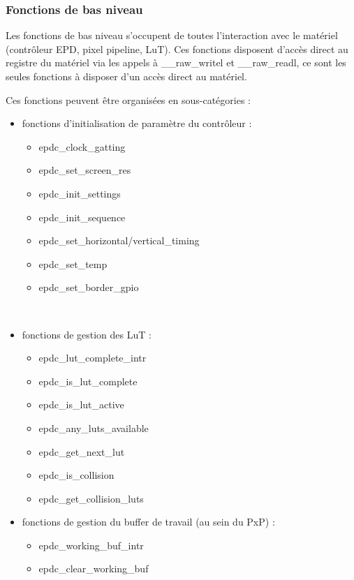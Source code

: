 \subsubsection{Fonctions de bas niveau}

Les fonctions de bas niveau s'occupent de toutes l'interaction avec le matériel (contrôleur EPD, pixel pipeline, LuT).
Ces fonctions disposent d'accès direct au registre du matériel via les appels à \_\_raw\_writel et \_\_raw\_readl, ce sont les seules fonctions à disposer d'un accès direct au matériel.


Ces fonctions peuvent être organisées en sous-catégories : 

\begin{itemize}
\renewcommand{\labelitemi}{$\bullet$}
	\item fonctions d'initialisation de paramètre du contrôleur : 
		\begin{itemize}
		\renewcommand{\labelitemi}{$\to$}
			\item epdc\_clock\_gatting
			\item epdc\_set\_screen\_res
			\item epdc\_init\_settings
			\item epdc\_init\_sequence
			\item epdc\_set\_horizontal/vertical\_timing
			\item epdc\_set\_temp
			\item epdc\_set\_border\_gpio
		\end{itemize}
		~\\
	\item fonctions de gestion des LuT : 
		\begin{itemize}
			\item epdc\_lut\_complete\_intr
			\item epdc\_is\_lut\_complete
			\item epdc\_is\_lut\_active
			\item epdc\_any\_luts\_available
			\item epdc\_get\_next\_lut
			\item epdc\_is\_collision
			\item epdc\_get\_collision\_luts
		\end{itemize}
	\item fonctions de gestion du buffer de travail (au sein du PxP) : 
		\begin{itemize}
			\item epdc\_working\_buf\_intr
			\item epdc\_clear\_working\_buf

\end{itemize}
\end{itemize}
